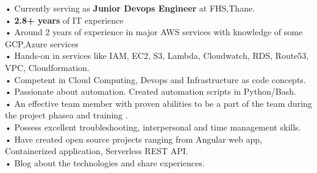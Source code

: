 \documentclass[9pt]{developercv} %
\begin{document}
\vspace{0.5cm}



\begin{minipage}[t]{1\textwidth} %
	\vspace{-\baselineskip} %
	
 • Currently  serving as \textbf{Junior Devops Engineer} at FHS,Thane. \\ • \textbf{2.8+ years} of IT experience  \\
    • Around 2 years of experience in major AWS services with knowledge of some GCP,Azure services \\
    • Hands-on in services like IAM, EC2, S3, Lambda, Cloudwatch, RDS, Route53, VPC, Cloudformation.\\
    • Competent in Cloud Computing, Devops and Infrastructure as code concepts. \\
    • Passionate about automation. Created automation scripts in Python/Bash.\\
    • An effective team member with proven abilities to be a part of the team during the project phasea and training .\\
    • Possess excellent troubleshooting, interpersonal and time management skills.\\
    • Have created open source projects ranging from Angular web app, Containerized application, Serverless REST API.\\
    • Blog about the technologies and share experiences. \\
    

\end{minipage}


\end{document}
